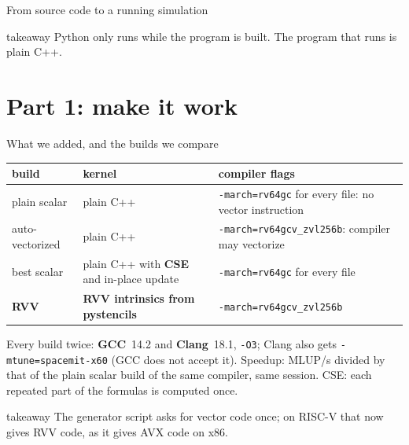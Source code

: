 \documentclass[aspectratio=169,10pt,t]{beamer}
\newcommand{\term}[1]{\textcolor{psblue!85!black}{\textbf{#1}}} %
\newcommand{\code}[1]{\texttt{#1}}
\newcommand{\takeaway}[1]{\par\vfill
  \begin{beamercolorbox}[wd=\textwidth,sep=4pt,rounded=true]{takeaway}
    \small #1
  \end{beamercolorbox}}
\begin{document}
\begin{frame}{From source code to a running simulation}
  \vspace{1mm}
  \centering
  \takeaway{Python only runs while the program is built. The program that runs is plain C++.}
\end{frame}

\section{Part 1: make it work}

\begin{frame}{What we added, and the builds we compare}
  \vspace{2mm}
  \centering

  \vspace{5mm}
  {\footnotesize\renewcommand{\arraystretch}{1.15}
  \begin{tabular}{@{}lll@{}}
    \toprule
    \textbf{build} & \textbf{kernel} & \textbf{compiler flags}\\
    \midrule
    plain scalar & plain C++ & \code{-march=rv64gc} for every file: no vector instruction\\
    auto-vectorized & plain C++ & \code{-march=rv64gcv\_zvl256b}: compiler may vectorize\\
    best scalar & plain C++ with \term{CSE} and in-place update & \code{-march=rv64gc} for every file\\
    \textbf{RVV} & \textbf{RVV intrinsics from pystencils} & \code{-march=rv64gcv\_zvl256b}\\
    \bottomrule
  \end{tabular}\par}

  \vspace{2mm}
  {\scriptsize\color{psgray}Every build twice: \term{GCC}~14.2 and \term{Clang}~18.1, \code{-O3}; Clang also
  gets \code{-mtune=spacemit-x60} (GCC does not accept it). Speedup: MLUP/s divided by that of the
  plain scalar build of the same compiler, same session. CSE: each repeated part of the formulas is
  computed once.\par}
  \takeaway{The generator script asks for vector code once; on RISC-V that now gives RVV code, as it
    gives AVX code on x86.}
\end{frame}
\end{document}
